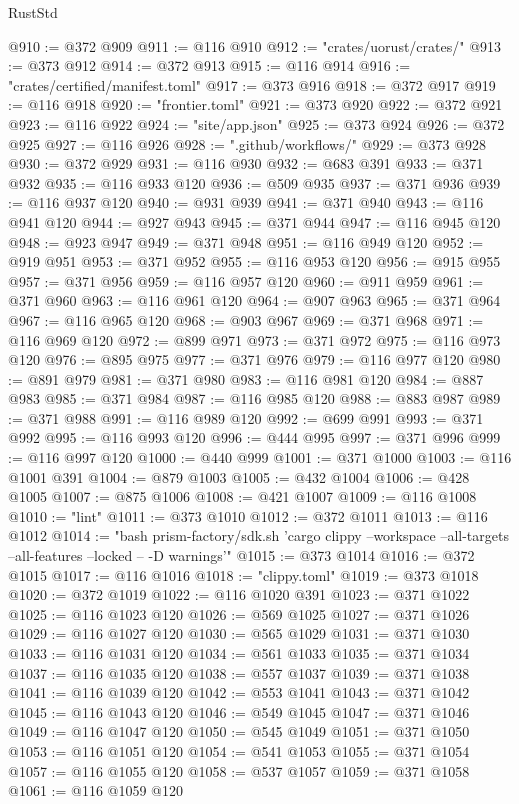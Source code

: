 \begin{lexlean}{RustStd}
\begin{coremodule}
@910 := @372 @909
@911 := @116 @910
@912 := "crates/uorust/crates/"
@913 := @373 @912
@914 := @372 @913
@915 := @116 @914
@916 := "crates/certified/manifest.toml"
@917 := @373 @916
@918 := @372 @917
@919 := @116 @918
@920 := "frontier.toml"
@921 := @373 @920
@922 := @372 @921
@923 := @116 @922
@924 := "site/app.json"
@925 := @373 @924
@926 := @372 @925
@927 := @116 @926
@928 := ".github/workflows/"
@929 := @373 @928
@930 := @372 @929
@931 := @116 @930
@932 := @683 @391
@933 := @371 @932
@935 := @116 @933 @120
@936 := @509 @935
@937 := @371 @936
@939 := @116 @937 @120
@940 := @931 @939
@941 := @371 @940
@943 := @116 @941 @120
@944 := @927 @943
@945 := @371 @944
@947 := @116 @945 @120
@948 := @923 @947
@949 := @371 @948
@951 := @116 @949 @120
@952 := @919 @951
@953 := @371 @952
@955 := @116 @953 @120
@956 := @915 @955
@957 := @371 @956
@959 := @116 @957 @120
@960 := @911 @959
@961 := @371 @960
@963 := @116 @961 @120
@964 := @907 @963
@965 := @371 @964
@967 := @116 @965 @120
@968 := @903 @967
@969 := @371 @968
@971 := @116 @969 @120
@972 := @899 @971
@973 := @371 @972
@975 := @116 @973 @120
@976 := @895 @975
@977 := @371 @976
@979 := @116 @977 @120
@980 := @891 @979
@981 := @371 @980
@983 := @116 @981 @120
@984 := @887 @983
@985 := @371 @984
@987 := @116 @985 @120
@988 := @883 @987
@989 := @371 @988
@991 := @116 @989 @120
@992 := @699 @991
@993 := @371 @992
@995 := @116 @993 @120
@996 := @444 @995
@997 := @371 @996
@999 := @116 @997 @120
@1000 := @440 @999
@1001 := @371 @1000
@1003 := @116 @1001 @391
@1004 := @879 @1003
@1005 := @432 @1004
@1006 := @428 @1005
@1007 := @875 @1006
@1008 := @421 @1007
@1009 := @116 @1008
@1010 := "lint"
@1011 := @373 @1010
@1012 := @372 @1011
@1013 := @116 @1012
@1014 := "bash prism-factory/sdk.sh 'cargo clippy --workspace --all-targets --all-features --locked -- -D warnings'"
@1015 := @373 @1014
@1016 := @372 @1015
@1017 := @116 @1016
@1018 := "clippy.toml"
@1019 := @373 @1018
@1020 := @372 @1019
@1022 := @116 @1020 @391
@1023 := @371 @1022
@1025 := @116 @1023 @120
@1026 := @569 @1025
@1027 := @371 @1026
@1029 := @116 @1027 @120
@1030 := @565 @1029
@1031 := @371 @1030
@1033 := @116 @1031 @120
@1034 := @561 @1033
@1035 := @371 @1034
@1037 := @116 @1035 @120
@1038 := @557 @1037
@1039 := @371 @1038
@1041 := @116 @1039 @120
@1042 := @553 @1041
@1043 := @371 @1042
@1045 := @116 @1043 @120
@1046 := @549 @1045
@1047 := @371 @1046
@1049 := @116 @1047 @120
@1050 := @545 @1049
@1051 := @371 @1050
@1053 := @116 @1051 @120
@1054 := @541 @1053
@1055 := @371 @1054
@1057 := @116 @1055 @120
@1058 := @537 @1057
@1059 := @371 @1058
@1061 := @116 @1059 @120

\end{coremodule}
\end{lexlean}
